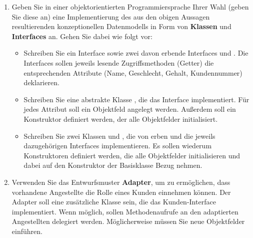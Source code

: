 \documentclass{lehramt-informatik-aufgabe}
\begin{document}
\begin{enumerate}


\item Geben Sie in einer objektorientierten Programmiersprache Ihrer
Wahl (geben Sie diese an) eine Implementierung des aus den obigen
Aussagen resultierenden konzeptionellen Datenmodells in Form von
\textbf{Klassen} und \textbf{Interfaces} an. Gehen Sie dabei wie folgt
vor:

\begin{itemize}
\item Schreiben Sie ein Interface 
sowie zwei davon erbende Interfaces  und
. Die Interfaces sollen jeweils lesende
Zugriffsmethoden (Getter) die entsprechenden Attribute (Name,
Geschlecht, Gehalt, Kundennummer) deklarieren.

\begin{liAntwort}
\end{liAntwort}

\item Schreiben Sie eine abstrakte Klasse
, die das Interface 
implementiert. Für jedes Attribut soll ein Objektfeld angelegt werden.
Außerdem soll ein Konstruktor definiert werden, der alle Objektfelder
initialisiert.

\begin{liAntwort}
\end{liAntwort}

\item Schreiben Sie zwei Klassen  und
, die von  erben und die
jeweils dazugehörigen Interfaces implementieren. Es sollen wiederum
Konstruktoren definiert werden, die alle Objektfelder initialisieren und
dabei auf den Konstruktor der Basisklasse  Bezug
nehmen.

\begin{liAntwort}
\end{liAntwort}
\end{itemize}


\item Verwenden Sie das Entwurfsmuster \textbf{Adapter}, um zu
ermöglichen, dass vorhandene Angestellte die Rolle eines Kunden
einnehmen können. Der Adapter soll eine zusätzliche Klasse sein, die das
Kunden-Interface implementiert. Wenn möglich, sollen Methodenaufrufe an
den adaptierten Angestellten delegiert werden. Möglicherweise müssen Sie
neue Objektfelder einführen.


\end{enumerate}
\end{document}
